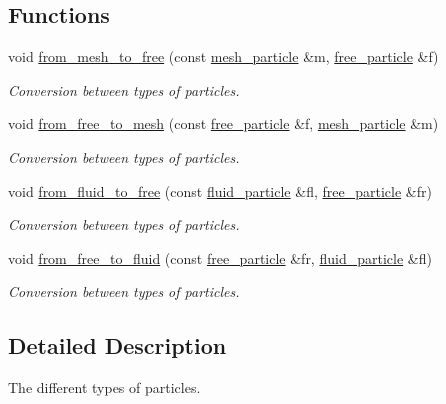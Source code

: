 \subsection*{Functions}
\begin{DoxyCompactItemize}
\item 
void \hyperlink{namespacephysim_1_1particles_a27c0b9cd8f45bd93f376917858b0951e}{from\+\_\+mesh\+\_\+to\+\_\+free} (const \hyperlink{classphysim_1_1particles_1_1mesh__particle}{mesh\+\_\+particle} \&m, \hyperlink{classphysim_1_1particles_1_1free__particle}{free\+\_\+particle} \&f)
\begin{DoxyCompactList}\small\item\em Conversion between types of particles. \end{DoxyCompactList}\item 
void \hyperlink{namespacephysim_1_1particles_ae47fe8ddd8684c737761f5a4fd8dbc6f}{from\+\_\+free\+\_\+to\+\_\+mesh} (const \hyperlink{classphysim_1_1particles_1_1free__particle}{free\+\_\+particle} \&f, \hyperlink{classphysim_1_1particles_1_1mesh__particle}{mesh\+\_\+particle} \&m)
\begin{DoxyCompactList}\small\item\em Conversion between types of particles. \end{DoxyCompactList}\item 
void \hyperlink{namespacephysim_1_1particles_a48784a80a2e7e633a40a79fcd54e4f55}{from\+\_\+fluid\+\_\+to\+\_\+free} (const \hyperlink{classphysim_1_1particles_1_1fluid__particle}{fluid\+\_\+particle} \&fl, \hyperlink{classphysim_1_1particles_1_1free__particle}{free\+\_\+particle} \&fr)
\begin{DoxyCompactList}\small\item\em Conversion between types of particles. \end{DoxyCompactList}\item 
void \hyperlink{namespacephysim_1_1particles_a47e79e4da1099cd888baf9f67122d3d5}{from\+\_\+free\+\_\+to\+\_\+fluid} (const \hyperlink{classphysim_1_1particles_1_1free__particle}{free\+\_\+particle} \&fr, \hyperlink{classphysim_1_1particles_1_1fluid__particle}{fluid\+\_\+particle} \&fl)
\begin{DoxyCompactList}\small\item\em Conversion between types of particles. \end{DoxyCompactList}\end{DoxyCompactItemize}


\subsection{Detailed Description}
The different types of particles. 

